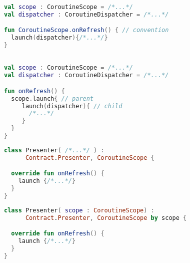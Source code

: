 \documentclass[10pt]{beamer}
\begin{document}
\begin{frame}[fragile]
\begin{lstlisting}[language=Kotlin, basicstyle=\ttfamily]

val scope : CoroutineScope = /*...*/
val dispatcher : CoroutineDispatcher = /*...*/

fun CoroutineScope.onRefresh() { // convention 
  launch(dispatcher){/*...*/}
}

\end{lstlisting}
\end{frame}



\begin{frame}[fragile]
\begin{lstlisting}[language=Kotlin, basicstyle=\ttfamily]

val scope : CoroutineScope = /*...*/
val dispatcher : CoroutineDispatcher = /*...*/

fun onRefresh() {
  scope.launch{ // parent 
     launch(dispatcher){ // child 
       /*...*/
     }
  }
}
\end{lstlisting}
\end{frame}

\begin{frame}[fragile]
\begin{lstlisting}[language=Kotlin, basicstyle=\ttfamily]
class Presenter( /*...*/ ) : 
      Contract.Presenter, CoroutineScope {

  override fun onRefresh() {
    launch {/*...*/}
  }
}
\end{lstlisting}
\end{frame}

\begin{frame}[fragile]
\begin{lstlisting}[language=Kotlin, basicstyle=\ttfamily]
class Presenter( scope : CoroutineScope) : 
      Contract.Presenter, CoroutineScope by scope {

  override fun onRefresh() {
    launch {/*...*/}
  }
}
\end{lstlisting}
\end{frame}
\end{document}
